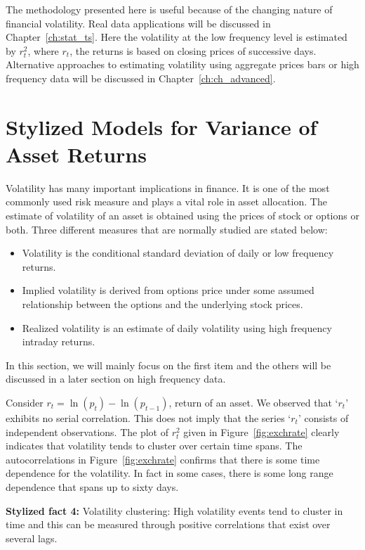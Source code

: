 The methodology presented here is useful because of the changing nature of financial volatility. Real data applications will be discussed in Chapter~\ref{ch:stat_ts}. Here the volatility at the low frequency level is estimated by $r_t^2$, where $r_t$, the returns is based on closing prices of successive days. Alternative approaches to estimating volatility using aggregate prices bars or high frequency data will be discussed in Chapter~\ref{ch:ch_advanced}. 



\section{Stylized Models for Variance of Asset Returns \label{sec:sty_mod_var}}


Volatility has many important implications in finance. It is one of the most commonly used risk measure and plays a vital role in asset allocation. The estimate of volatility of an asset is obtained using the prices of stock or options or both. Three different measures that are normally studied are stated below:


\begin{itemize}
\item Volatility is the conditional standard deviation of daily or low frequency returns.
\item Implied volatility is derived from options price under some assumed relationship between the options and the underlying stock prices.
\item Realized volatility is an estimate of daily volatility using high frequency intraday returns.
\end{itemize}


In this section, we will mainly focus on the first item and the others will be discussed in a later section on high frequency data.


Consider $r_t = \ln{(p_t) - \ln{(p_{t-1})}}$, return of an asset. We observed that `$r_t$' exhibits no serial correlation. This does not imply that the series `$r_t$' consists of independent observations. The plot of $r_t^2$ given in Figure~\ref{fig:exchrate} clearly indicates that volatility tends to cluster over certain time spans. The autocorrelations in Figure~\ref{fig:exchrate} confirms that there is some time dependence for the volatility. In fact in some cases, there is some long range dependence that spans up to sixty days. \twomedskip


\noindent\textbf{Stylized fact 4:} Volatility clustering: High volatility events tend to cluster in time and this can be measured through positive correlations that exist over several lags.


